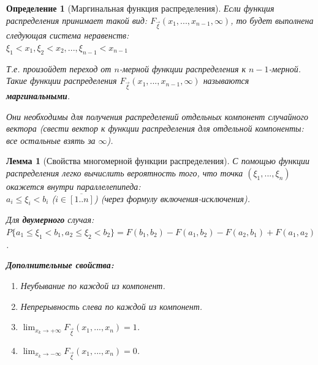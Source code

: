 \documentclass[14pt]{extarticle}
\theoremstyle{breakstyle}
\newtheorem{definition}{Определение}[subsection]
\newtheorem{lemma}{Лемма}[subsection]
\begin{document}
\begin{definition}[Маргинальная функция распределения]
Если функция распределения принимает такой вид: $F_{\vec{\xi}}(x_{1}, ..., x_{n-1}, \infty)$, то будет выполнена следующая система неравенств: \\
$\xi_{1} < x_{1}, \xi_{2} < x_{2}, ..., \xi_{n-1} < x_{n-1}$

\vspace{\baselineskip}

Т.е. произойдет переход от $n$-мерной функции распределения к $n-1$-мерной. Такие функции распределения $F_{\vec{\xi}}(x_{1}, ..., x_{n-1}, \infty)$ называются \textbf{маргинальными}.

\vspace{\baselineskip}

Они необходимы для получения распределений отдельных компонент случайного вектора (свести вектор к функции распределения для отдельной компоненты: все остальные взять за $\infty$).

\end{definition}

\begin{lemma}[Свойства многомерной функции распределения]

С помощью функции распределения легко вычислить вероятность того, что точка $(\xi_{1}, ..., \xi_{n})$ окажется внутри параллелепипеда:\\
$a_{i} \leq \xi_{i} < b_{i}$ ($i \in \overline{[1..n]}$) (через формулу включения-исключения).

\vspace{\baselineskip}

Для \textbf{двумерного} случая:\\
$P\{a_{1} \leq \xi_{1} < b_{1}, a_{2} \leq \xi_{2} < b_{2}\} = F(b_{1}, b_{2}) - F(a_{1}, b_{2}) - F(a_{2}, b_{1}) + F(a_{1}, a_{2})$.

\vspace{\baselineskip}

\textbf{Дополнительные свойства:}
\begin{enumerate}
    \item Неубывание по каждой из компонент.
    \item Непрерывность слева по каждой из компонент.
    \item $\lim_{x_{k} \to +\infty} F_{\vec{\xi}}(x_{1}, ..., x_{n}) = 1$.
    \item $\lim_{x_{k} \to -\infty} F_{\vec{\xi}}(x_{1}, ..., x_{n}) = 0$.
\end{enumerate}

\end{lemma}
\end{document}
